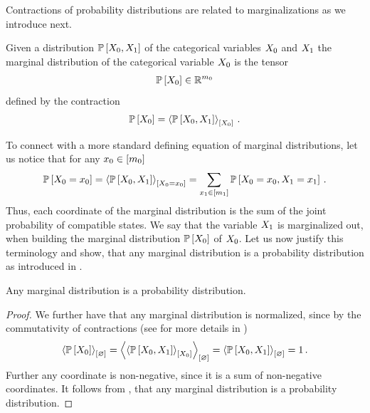 
Contractions of probability distributions are related to marginalizations as we introduce next.

\begin{definition}
    \label{def:marginalProbability}
    Given a distribution $\mathbb{P}\left[X_{0},X_{1}\right]$ of the categorical variables $X_{0}$ and $X_{1}$ the marginal distribution of the categorical variable $X_{0}$ is the tensor
    \begin{align*}
        \probat{\exrandom} \in \rr^{\exranddim} %
    \end{align*}
    defined by the contraction
    \begin{align*}
        \mathbb{P}\left[X_{0}\right]
        = \left\langle \mathbb{P}\left[X_{0},X_{1}\right]\right\rangle_{\left[ X_{0} \right]} \, .
    \end{align*}
\end{definition}

To connect with a more standard defining equation of marginal distributions, let us notice that for any $x_{0}\in[m_{0}]$
\begin{align*}
    \mathbb{P}\left[X_{0}=x_{0}\right]
    = \left\langle \mathbb{P}\left[X_{0},X_{1}\right]\right\rangle_{\left[ X_{0}=x_{0} \right]}
    = \sum_{x_{1}\in[m_{1}]} \mathbb{P}\left[X_{0}=x_{0},X_{1}=x_{1}\right] \, .
\end{align*}
Thus, each coordinate of the marginal distribution is the sum of the joint probability of compatible states.
We say that the variable $X_{1}$ is marginalized out, when building the marginal distribution $\mathbb{P}\left[X_{0}\right]$ of $X_{0}$.
Let us now justify this terminology and show, that any marginal distribution is a probability distribution as introduced in .

\begin{theorem}
    \label{the:marginalContraction}
    Any marginal distribution is a probability distribution.
\end{theorem}
\begin{proof}
    We further have that any marginal distribution is normalized, since by the commutativity of contractions (see for more details  in )
    \begin{align*}
        \left\langle \mathbb{P}\left[X_{0}\right]\right\rangle_{\left[ \varnothing \right]} = \left\langle \left\langle \mathbb{P}\left[X_{0},X_{1}\right]\right\rangle_{\left[ X_{0} \right]}\right\rangle_{\left[ \varnothing \right]} = \left\langle \mathbb{P}\left[X_{0},X_{1}\right]\right\rangle_{\left[ \varnothing \right]} = 1 \, .
    \end{align*}
    Further any coordinate is non-negative, since it is a sum of non-negative coordinates.
    It follows from , that any marginal distribution is a probability distribution.
\end{proof}

